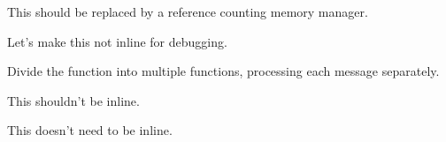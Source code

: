 
\begin{DoxyRefList}
\item[\label{todo__todo000001}%
\hypertarget{todo__todo000001}{}%
Member \hyperlink{class_client_manager_abac29dfed67c8b8354cf07267fd5515b}{Client\-Manager\-:\-:$\sim$\-Client\-Manager} (void)]This should be replaced by a reference counting memory manager.  
\item[\label{todo__todo000005}%
\hypertarget{todo__todo000005}{}%
Member \hyperlink{class_control_manager_a927449c3a4ba8a5bdc23e3747d5bb077}{Control\-Manager\-:\-:Get\-Client\-Name} (const T\-Client\-Id client\-Id)]Let's make this not inline for debugging. 
\item[\label{todo__todo000002}%
\hypertarget{todo__todo000002}{}%
Member \hyperlink{class_control_manager_a2dc55da1b01fd175b3d885c68b8a7524}{Control\-Manager\-:\-:Process\-Data} (void $\ast$data, const size\-\_\-t size)]Divide the function into multiple functions, processing each message separately. 
\item[\label{todo__todo000004}%
\hypertarget{todo__todo000004}{}%
Member \hyperlink{class_control_manager_a56df538a5380c9091123a5a8a5e0fe86}{Control\-Manager\-:\-:Register\-Client} (const T\-Client\-Id client\-Id, const T\-Client\-Name \&client\-Name, \hyperlink{class_client_manager}{Client\-Manager} $\ast$client\-Manager)]This shouldn't be inline. 
\item[\label{todo__todo000003}%
\hypertarget{todo__todo000003}{}%
Member \hyperlink{class_control_manager_a4e23ffb481554c26cf99c411dd16ae36}{Control\-Manager\-:\-:Wait\-Until\-Ready} (void)]This doesn't need to be inline. 
\end{DoxyRefList}